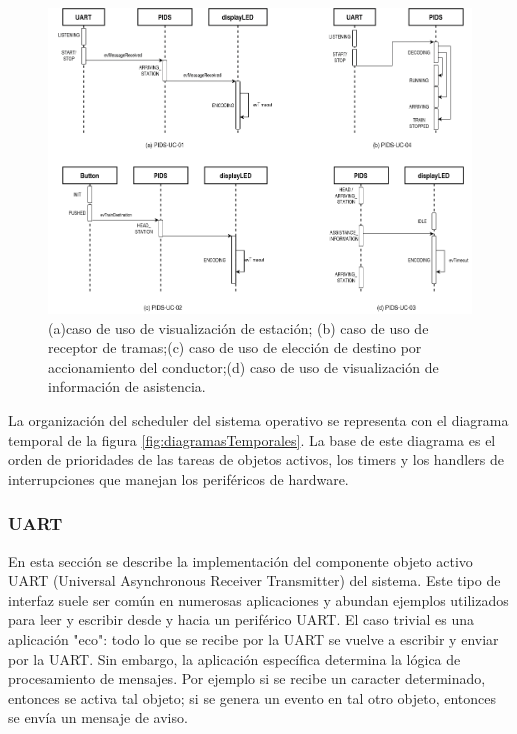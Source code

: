 \begin{figure}[ht]
	\centering
	\includegraphics[width=1\textwidth]{../Figures/secuenciasSistema.png}
	\caption{(a)caso de uso de visualización de estación; (b) caso de uso de receptor de tramas;(c) caso de uso de elección de destino por accionamiento del conductor;(d) caso de uso de visualización de información de asistencia.}
	\label{fig:diagramaSecuenciaSistema}
\end{figure}


La organización del scheduler del sistema operativo se representa con el diagrama temporal de la figura \ref{fig:diagramasTemporales}. La base de este diagrama es el orden de prioridades de las tareas de objetos activos, los timers y los handlers de interrupciones que manejan los periféricos de hardware.\\

\subsubsection{UART}

En esta sección se describe la implementación del componente objeto activo UART (Universal Asynchronous Receiver Transmitter) del sistema. Este tipo de interfaz suele ser común en numerosas aplicaciones y abundan ejemplos utilizados para leer y escribir desde y hacia un periférico UART. El caso trivial es una aplicación "eco": todo lo que se recibe por la UART se vuelve a escribir y enviar por la UART. Sin embargo, la aplicación específica determina la lógica de procesamiento de mensajes. Por ejemplo si se recibe un caracter determinado, entonces se activa tal objeto; si se genera un evento en tal otro objeto, entonces se envía un mensaje de aviso. \\

